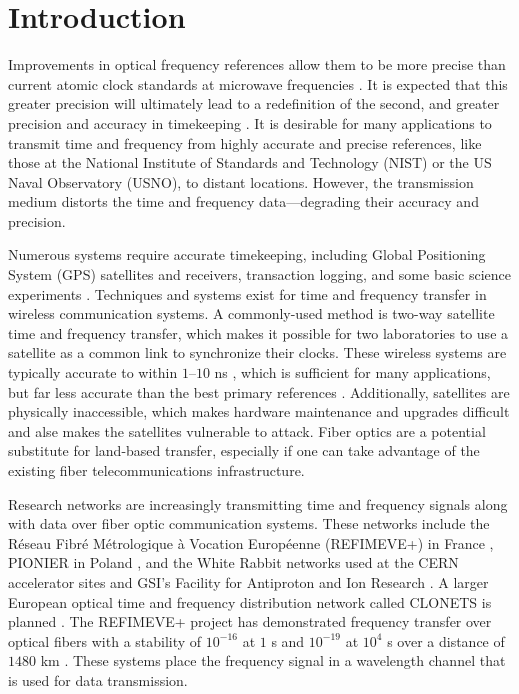 \chapter{Introduction}

Improvements in optical frequency references allow them to be more precise than current atomic clock standards at microwave frequencies \cite{ProgressOpticalClock, RedefinitionOfSecond, Diddams2004}. It is expected that this greater precision will ultimately lead to a redefinition of the second, and greater precision and accuracy in timekeeping \cite{RedefinitionOfSecond}. It is desirable for many applications to transmit time and frequency from highly accurate and precise references, like those at the National Institute of Standards and Technology (NIST) or the US Naval Observatory (USNO), to distant locations. However, the transmission medium distorts the time and frequency data---degrading their accuracy and precision.


Numerous systems require accurate timekeeping, including Global Positioning System (GPS) satellites and receivers, transaction logging, and some basic science experiments \cite{ScienceOfTimekeeping}. Techniques and systems exist for time and frequency transfer in wireless communication systems.  A commonly-used method is two-way satellite time and frequency transfer, which makes it possible for two laboratories to use a satellite as a common link to synchronize their clocks. These wireless systems are typically accurate to within $1$--$10$ ns \cite{Allan1980}, which is sufficient for many applications, but far less accurate than the best primary references \cite{NISTFreqStandards, Audoin1976}. Additionally, satellites are physically inaccessible, which makes hardware maintenance and upgrades difficult and alse makes the satellites vulnerable to attack. Fiber optics are a potential substitute for land-based transfer, especially if one can take advantage of the existing fiber telecommunications infrastructure.


Research networks are increasingly transmitting time and frequency signals along with data over fiber optic communication systems. These networks include the R\'eseau Fibr\'e M\'etrologique \`a Vocation Europ\'eenne (REFIMEVE+) in France \cite{cantin2017progress}, PIONIER in Poland \cite{Turza2017}, 
and the White Rabbit networks used at the CERN accelerator sites and GSI's Facility for Antiproton and Ion Research \cite{Serrano2013}.  
A larger European optical time and frequency distribution network called CLONETS is planned \cite{CLONETS}.
The REFIMEVE+ project has demonstrated frequency transfer over optical fibers with a stability of $10^{-16}$ at $1$ s and $10^{-19}$ at $10^4$ s over a distance of $1480$ km \cite{cantin2017progress}. These systems place the frequency signal in a wavelength channel that is used for data transmission.

